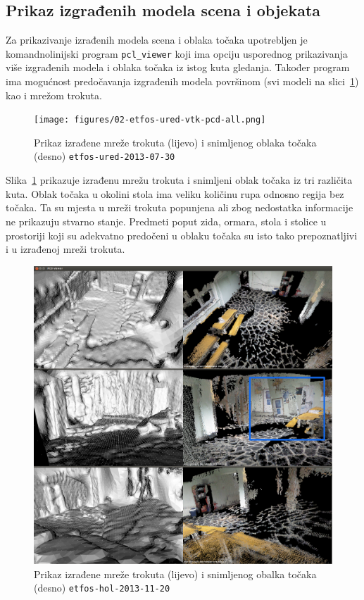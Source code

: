 \newpage
\subsection{Prikaz izgrađenih modela scena i objekata} %
\label{sub:Prikaz izgradenih modela scena i objekata}

Za prikazivanje izrađenih modela scena i oblaka točaka upotrebljen je
komandnolinijski program \texttt{pcl\_viewer} koji ima opciju usporednog
prikazivanja više izgrađenih modela i oblaka točaka iz istog kuta
gledanja. Također program ima mogućnost predočavanja izgrađenih modela
površinom (svi modeli na slici~\ref{fig:etfos-ured}) kao i mrežom
trokuta.

\begin{figure}[h]
\centering
\texttt{[image: figures/02-etfos-ured-vtk-pcd-all.png]}
\caption{Prikaz izrađene mreže trokuta (lijevo) i snimljenog oblaka točaka
(desno) \texttt{etfos-ured-2013-07-30}}
\label{fig:etfos-ured}
\end{figure}

Slika~\ref{fig:etfos-ured} prikazuje izrađenu mrežu trokuta i snimljeni
oblak točaka iz tri različita kuta. Oblak točaka u okolini stola ima
veliku količinu rupa odnosno regija bez točaka. Ta su mjesta u mreži
trokuta popunjena ali zbog nedostatka informacije ne prikazuju stvarno
stanje. Predmeti poput zida, ormara, stola i stolice u prostoriji koji
su adekvatno predočeni u oblaku točaka su isto tako prepoznatljivi i u
izrađenoj mreži trokuta.

\newpage
\begin{figure}[h]
\centering
\includegraphics[scale=0.25]{figures/03-etfos-hol-vtk-pcd-all.png}
\caption{Prikaz izrađene mreže trokuta (lijevo) i snimljenog obalka točaka
(desno) \texttt{etfos-hol-2013-11-20}}
\label{fig:etfos-hol}
\end{figure}

